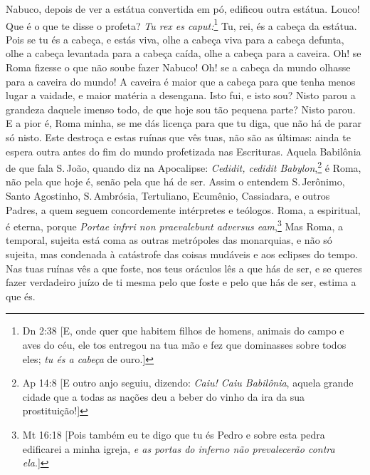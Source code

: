 Nabuco, depois de ver a estátua convertida em pó, edificou outra
estátua. Louco! Que é o que te disse o profeta? \emph{Tu rex es caput:}\footnote{Dn 2:38 [E, onde quer que habitem filhos de homens, animais do campo e aves do céu, ele tos
entregou na tua mão e fez que dominasses sobre todos eles; \emph{tu és a cabeça} de ouro.]}
Tu, rei, és a cabeça da estátua. Pois se tu és a cabeça, 
e estás viva, olhe a cabeça viva para a cabeça defunta, olhe a cabeça
levantada para a cabeça caída, olhe a cabeça para a caveira. Oh! se Roma
fizesse o que não soube fazer Nabuco! Oh! se a cabeça da mundo olhasse
para a caveira do mundo! A caveira é maior que a cabeça para que tenha
menos lugar a vaidade, e maior matéria a desengana. Isto fui, e isto
sou? Nisto parou a grandeza daquele imenso todo, de que hoje sou tão
pequena parte? Nisto parou. E a pior é, Roma minha, se me dás licença
para que tu diga, que não há de parar só nisto. Este destroça e estas
ruínas que vês tuas, não são as últimas: ainda te espera outra antes do
fim do mundo profetizada nas Escrituras. Aquela Babilônia de que fala S.\,João, quando diz na Apocalipse: \emph{Cedidit, cedidit Babylon},\footnote{Ap 14:8 [E outro anjo seguiu, dizendo: \emph{Caiu! Caiu Babilônia}, aquela grande cidade que a todas as
nações deu a beber do vinho da ira da sua prostituição!]}
é Roma, não pela que hoje é, senão pela que há de ser. Assim o
entendem S.\,Jerônimo, Santo Agostinho, S.\,Ambrósia, Tertuliano,
Ecumênio, Cassiadara, e outros Padres, a quem seguem concordemente
intérpretes e teólogos. Roma, a espiritual, é eterna, porque
\emph{Portae infrri non praevalebunt adversus eam},\footnote{Mt 16:18 [Pois também eu te digo que tu és Pedro e sobre esta pedra edificarei a minha igreja, \emph{e as
portas do inferno não prevalecerão contra ela}.]} Mas Roma, a
temporal, sujeita está coma as outras metrópoles das monarquias, e não
só sujeita, mas condenada à catástrofe das coisas mudáveis e aos eclipses
do tempo. Nas tuas ruínas vês a que foste, nos teus oráculos lês a que
hás de ser, e se queres fazer verdadeiro juízo de ti mesma pelo que
foste e pelo que hás de ser, estima a que és.

